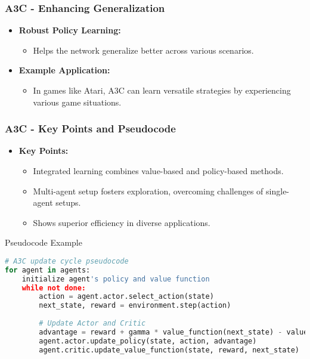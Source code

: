 \documentclass{beamer}
\begin{document}
\begin{frame}[fragile]
    \frametitle{A3C - Enhancing Generalization}
    \begin{itemize}
        \item \textbf{Robust Policy Learning:} 
        \begin{itemize}
            \item Helps the network generalize better across various scenarios.
        \end{itemize}
        \item \textbf{Example Application:} 
        \begin{itemize}
            \item In games like Atari, A3C can learn versatile strategies by experiencing various game situations.
        \end{itemize}
    \end{itemize}
\end{frame}

\begin{frame}[fragile]
    \frametitle{A3C - Key Points and Pseudocode}
    \begin{itemize}
        \item \textbf{Key Points:}
        \begin{itemize}
            \item Integrated learning combines value-based and policy-based methods.
            \item Multi-agent setup fosters exploration, overcoming challenges of single-agent setups.
            \item Shows superior efficiency in diverse applications.
        \end{itemize}
    \end{itemize}
    \begin{block}{Pseudocode Example}
    \begin{lstlisting}[language=Python]
# A3C update cycle pseudocode
for agent in agents:
    initialize agent's policy and value function
    while not done:
        action = agent.actor.select_action(state)
        next_state, reward = environment.step(action)
        
        # Update Actor and Critic
        advantage = reward + gamma * value_function(next_state) - value_function(state)
        agent.actor.update_policy(state, action, advantage)
        agent.critic.update_value_function(state, reward, next_state)
    \end{lstlisting}
    \end{block}
\end{frame}
\end{document}
